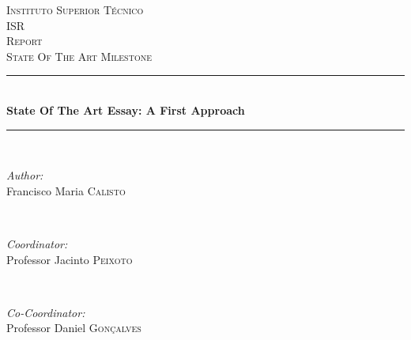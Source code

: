 \begin{titlepage}

\newcommand{\HRule}{\rule{\linewidth}{0.5mm}} %

\center %
 

\textsc{\LARGE Instituto Superior T\'{e}cnico}\\[1.5cm]
\textsc{\Large ISR}\\[0.5cm]
\textsc{\large Report}\\[0.25cm]
\textsc{\small State Of The Art Milestone}\\[0.25cm]


\HRule \\[0.5cm]
{ \large \bfseries State Of The Art Essay: A First Approach}\\[0.25cm] %
\HRule \\[0.5cm]
 

\begin{minipage}{0.4\textwidth}
\begin{flushleft} \large
\emph{Author:}\\
Francisco Maria \textsc{Calisto} %
\end{flushleft}
\end{minipage}
~
\begin{minipage}{0.4\textwidth}
\begin{flushright} \large
\emph{Coordinator:} \\
Professor Jacinto \textsc{Peixoto} %
\end{flushright}
~
\begin{flushright} \large
\emph{Co-Coordinator:} \\
Professor Daniel \textsc{Gon\c{c}alves} %
\end{flushright}
\end{minipage}\\[2cm]


\end{titlepage}

